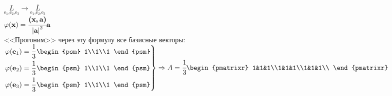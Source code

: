 \noindent$\underset{\text{e$_1$,e$_2$,e$_3$}}{L}\rightarrow\underset{\text{e$_1$,e$_2$,e$_3$}}{\overline{L}}$\\
$\varphi(\textbf{x})=\cfrac{\textbf{(x,\,a)}}{\left|\textbf{a}\right|^2}\textbf{a}$\\
<<Прогоним>> через эту формулу все базисные векторы:\\
$\left.
\begin{aligned}
\phi(\textbf{e$_1$})=\frac{1}{3}\begin{psm}
	1\\1\\1
\end{psm}\\
\phi(\textbf{e$_2$})=\frac{1}{3}\begin{psm}
	1\\1\\1
\end{psm}\\
\phi(\textbf{e$_3$})=\frac{1}{3}\begin{psm}
	1\\1\\1
\end{psm}
\end{aligned}
\right\}\Rightarrow A = \cfrac{1}{3}\begin{pmatrixr}
1&1&1\\1&1&1\\1&1&1\\
\end{pmatrixr}
$
\\






